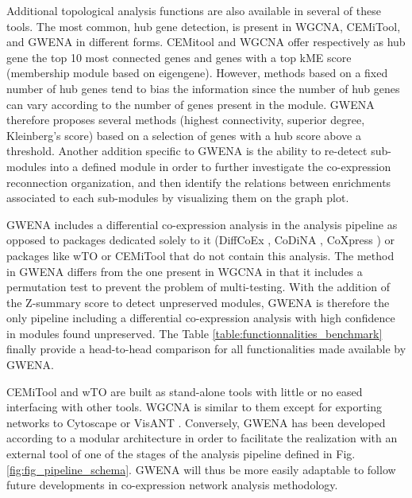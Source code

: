 Additional topological analysis functions are also available in several of these tools. The most common, hub gene detection, is present in WGCNA, CEMiTool, and GWENA in different forms. CEMitool and WGCNA offer respectively as hub gene the top 10 most connected genes and genes with a top kME score (membership module based on eigengene). However, methods based on a fixed number of hub genes tend to bias the information since the number of hub genes can vary according to the number of genes present in the module. GWENA therefore proposes several methods (highest connectivity, superior degree, Kleinberg's score) based on a selection of genes with a hub score above a threshold. Another addition specific to GWENA is the ability to re-detect sub-modules into a defined module in order to further investigate the co-expression reconnection organization, and then identify the relations between enrichments associated to each sub-modules by visualizing them on the graph plot.

GWENA includes a differential co-expression analysis in the analysis pipeline as opposed to packages dedicated solely to it (DiffCoEx , CoDiNA , CoXpress ) or packages like wTO or CEMiTool that do not contain this analysis. The method in GWENA differs from the one present in WGCNA in that it includes a permutation test to prevent the problem of multi-testing. With the addition of the Z-summary score to detect unpreserved modules, GWENA is therefore the only pipeline including a differential co-expression analysis with high confidence in modules found unpreserved. The Table \ref{table:functionnalities_benchmark} finally provide a head-to-head comparison for all functionalities made available by GWENA.

CEMiTool and wTO are built as stand-alone tools with little or no eased interfacing with other tools. WGCNA is similar to them except for exporting networks to Cytoscape  or VisANT . Conversely, GWENA has been developed according to a modular architecture in order to facilitate the realization with an external tool of one of the stages of the analysis pipeline defined in Fig. \ref{fig:fig_pipeline_schema}. GWENA will thus be more easily adaptable to follow future developments in co-expression network analysis methodology.

